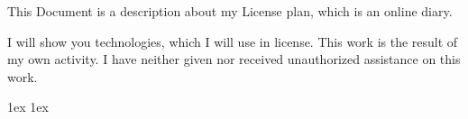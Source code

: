 \documentclass[final]{ubb_dolgozat}
\author{György Szilárd}
\begin{document}
	\begin{abstractEN} %
	This Document is a description about my License plan, which is an online diary.
	
	I will show you technologies, which I will use in license.
	This work is the result of my own activity. I have neither given nor 		received unauthorized assistance on this work.
	\end{abstractEN}

	\maketitle
	
	{\baselineskip 1ex  \parskip 1ex  \tableofcontents}

	
	
		
	{ \renewcommand{\baselinestretch}{0.8}\normalsize %
  \setlength{\itemsep}{-2.4mm}
  \setlength{\bibspacing}{0.67\baselineskip}
  
	
}
	
\end{document}
